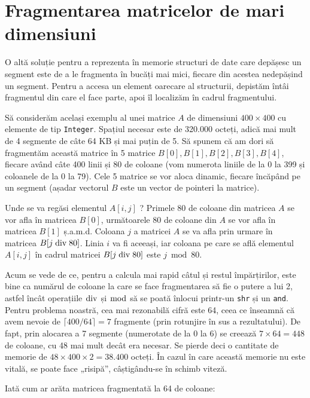 \section{Fragmentarea matricelor de mari dimensiuni}

O altă soluție pentru a reprezenta în memorie structuri de date care depășesc
un segment este de a le fragmenta în bucăți mai mici, fiecare din acestea
nedepășind un segment. Pentru a accesa un element oarecare al structurii,
depistăm întâi fragmentul din care el face parte, apoi îl localizăm în cadrul
fragmentului.

Să considerăm același exemplu al unei matrice $A$ de dimensiuni $400 \times
400$ cu elemente de tip {\tt Integer}. Spațiul necesar este de 320.000 octeți,
adică mai mult de 4 segmente de câte 64 KB și mai puțin de 5. Să spunem că am
dori să fragmentăm această matrice în 5 matrice $B[0], B[1], B[2], B[3],
B[4]$, fiecare având câte 400 linii și 80 de coloane (vom numerota liniile de
la 0 la 399 și coloanele de la 0 la 79).  Cele 5 matrice se vor aloca dinamic,
fiecare încăpând pe un segment (așadar vectorul $B$ este un vector de pointeri
la matrice).

Unde se va regăsi elementul $A[i,j]$ ? Primele 80 de coloane din matricea $A$
se vor afla în matricea $B[0]$, următoarele 80 de coloane din $A$ se vor afla
în matricea $B[1]$ ș.a.m.d. Coloana $j$ a matricei $A$ se va afla prin urmare
în matricea $B[j \bdiv 80]$. Linia $i$ va fi aceeași, iar coloana pe care se
află elementul $A[i,j]$ în cadrul matricei $B[j \bdiv 80]$ este $j \bmod 80$.

Acum se vede de ce, pentru a calcula mai rapid câtul și restul împărțirilor,
este bine ca numărul de coloane la care se face fragmentarea să fie o putere a
lui 2, astfel încât operațiile $\bdiv$ și $\bmod$ să se poată înlocui
printr-un {\tt shr} și un {\tt and}. Pentru problema noastră, cea mai
rezonabilă cifră este 64, ceea ce înseamnă că avem nevoie de $\lceil 400/64
\rceil = 7$ fragmente (prin rotunjire în sus a rezultatului). De fapt, prin
alocarea a 7 segmente (numerotate de la 0 la 6) se creează $7 \times 64 = 448$
de coloane, cu 48 mai mult decât era necesar. Se pierde deci o cantitate de
memorie de $48 \times 400 \times 2 = 38.400$ octeți. În cazul în care această
memorie nu este vitală, se poate face „risipă”, câștigându-se în schimb
viteză.

Iată cum ar arăta matricea fragmentată la 64 de coloane:

